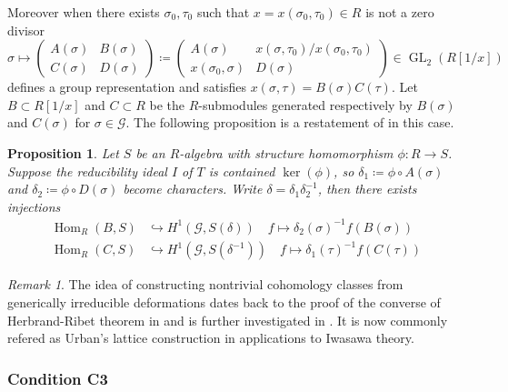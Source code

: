 \documentclass[leqno]{amsart}
\newtheorem{prop}[thm]{Proposition}
\theoremstyle{definition}
\theoremstyle{remark}
\newtheorem{rem}[thm]{Remark}
\DeclareMathOperator{\Hom}{Hom}
\DeclareMathOperator{\GL}{GL}
\begin{document}
Moreover when there exists $\sigma_0,\tau_0$ such that
$x=x(\sigma_0,\tau_0)\in R$ is not a zero divisor
\begin{equation}\label{eq:present_repn}
    \sigma\mapsto 
    \begin{pmatrix}
        A(\sigma)& B(\sigma)\\
        C(\sigma) & D(\sigma)
    \end{pmatrix}\coloneqq
    \begin{pmatrix}
        A(\sigma)& x(\sigma,\tau_0)/x(\sigma_0,\tau_0)\\
        x(\sigma_0,\sigma) & D(\sigma)
    \end{pmatrix}
        \in \GL_2(R[1/x])
\end{equation}
defines a group representation 
and satisfies $x(\sigma,\tau)=B(\sigma)C(\tau)$.
Let $B\subset R[1/x]$ and $C\subset R$
be the $R$-submodules generated respectively by
$B(\sigma)$ and $C(\sigma)$ for $\sigma\in\mathcal{G}$.
The following proposition is a restatement of 
\cite[Thm 1.5.5]{BC} in this case.
\begin{prop}\label{prop:BC}
Let $S$ be an $R$-algebra with structure 
homomorphism $\phi\colon R\to S$.
Suppose the reducibility ideal 
$I$ of $T$ is contained $\ker(\phi)$,
so $\delta_1\coloneqq \phi\circ A(\sigma)$
and $\delta_2\coloneqq \phi\circ D(\sigma)$
become characters.
Write $\delta=\delta_1\delta_2^{-1}$, then
there exists injections 
\begin{align*}
    \Hom_R(B,S)&\hookrightarrow H^1(\mathcal{G},S(\delta))\quad
    f\mapsto \delta_2(\sigma)^{-1}f(B(\sigma))\\
    \Hom_R(C,S)&\hookrightarrow H^1(\mathcal{G},S(\delta^{-1}))\quad
    f\mapsto \delta_1(\tau)^{-1}f(C(\tau))
\end{align*}
\end{prop}

\begin{rem}
The idea of constructing nontrivial cohomology classes
from generically irreducible deformations
dates back to the proof of the converse of
Herbrand-Ribet theorem in \cite{Ribet1976}
and is further investigated in \cite{Urban1999}.
It is now commonly refered as Urban's lattice construction
in applications to Iwasawa theory.
\end{rem}

\subsubsection{Condition C3}
\end{document}
